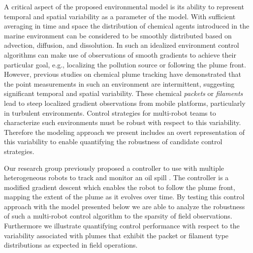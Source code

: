 \documentclass[ letterpaper, 10 pt, conference]{ieeeconf}  %
\begin{document}

A critical aspect of the proposed environmental model is its ability to represent temporal and spatial variability as a parameter of the model.  With sufficient averaging in time and space the distribution of chemical agents introduced in the marine environment can be considered to be smoothly distributed based on advection, diffusion, and dissolution.  In such an idealized environment control algorithms can make use of observations of smooth gradients to achieve their particular goal, e.g., localizing the pollution source or following the plume front.  However, previous studies on chemical plume tracking \cite{pang06chemical,Jones1983}  have demonstrated that the point measurements in such an environment are intermittent, suggesting significant temporal and spatial variability.  These chemical \emph{packets} or \emph{filaments} lead to steep localized gradient observations from mobile platforms, particularly in turbulent environments.  Control strategies for multi-robot teams to characterize such environments must be robust with respect to this variability.  Therefore the modeling approach we present includes an overt representation of this variability to enable quantifying the robustness of candidate control strategies.



Our research group previously proposed a controller to use with multiple heterogeneous robots to track and monitor an oil spill \cite{Li2014}.   The controller is a modified gradient descent which enables the robot to follow the plume front, mapping the extent of the plume as it evolves over time.
By testing this control approach with the model presented below we are able to analyze the robustness of such a multi-robot control algorithm to the sparsity of field observations.  Furthermore we illustrate quantifying control performance with respect to the variability associated with plumes that exhibit the packet or filament type distributions as expected in field operations.
\end{document}
